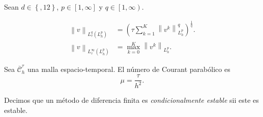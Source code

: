 \begin{definition}
    Sean
    \begin{math}
        d\in\left\{,12\right\}
    \end{math},
    \begin{math}
        p\in\left[1,\infty\right]
    \end{math}
    y
    \begin{math}
        q\in\left[1,\infty\right)
    \end{math}.

    \begin{align*}
        {\left\|v\right\|}_{L^{q}_{\tau}\left(L^{p}_{h}\right)}
         & =
        {\left(
        \tau\sum_{k=1}^{K}
        \left\|v^{k}\right\|^{q}_{L^{p}_{h}}
        \right)}^{\frac{1}{q}}. \\
        {\left\|v\right\|}_{L^{\infty}_{\tau}\left(L^{p}_{h}\right)}
         & =
        \max^{K}_{k=0}
        {\left\|v^{k}\right\|}_{L^{p}_{h}}.
    \end{align*}
\end{definition}

\begin{definition}
    Sea $\overline{\mathcal{C}}^{\tau}_{h}$ una malla espacio-temporal.
    El número de Courant parabólico es
    \begin{equation*}
        \mu=
        \dfrac{\tau}{h^{2}}.
    \end{equation*}
\end{definition}

\begin{definition}
    Decimos que un método de diferencia finita es \emph{condicionalmente estable} sii
    este es estable.
\end{definition}